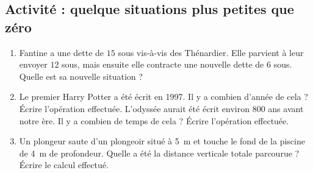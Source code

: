 
\subsection*{Activité : quelque situations plus petites que zéro}

\begin{enumerate}
    \item
        Fantine a une dette de \( 15\) sous vis-à-vis des Thénardier. Elle parvient à leur envoyer \( 12\) sous, mais ensuite elle contracte une nouvelle dette de \( 6\) sous. Quelle est sa nouvelle situation ?
    \item
        Le premier Harry Potter a été écrit en 1997. Il y a combien d'année de cela ? Écrire l'opération effectuée. L'odyssée aurait été écrit environ \( 800\) ans avant notre ère. Il y a combien de temps de cela ? Écrire l'opération effectuée.
    \item
        Un plongeur saute d'un plongeoir situé à \SI{5}{\meter} et touche le fond de la piscine de \SI{4}{\meter} de profondeur. Quelle a été la distance verticale totale parcourue ? Écrire le calcul effectué.

\end{enumerate}

